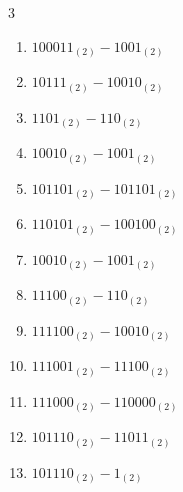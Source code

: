 \begin{multicols}{3}
\begin{enumerate}

  \item $100011_{(2)} - 1001_{(2)}$


  \item $10111_{(2)} - 10010_{(2)}$


  \item $1101_{(2)} - 110_{(2)}$


\columnbreak %

  \item $10010_{(2)} - 1001_{(2)}$


  \item $101101_{(2)} - 101101_{(2)}$


  \item $110101_{(2)} - 100100_{(2)}$


  \item $10010_{(2)} - 1001_{(2)}$


  \item $11100_{(2)} - 110_{(2)}$


  \item $111100_{(2)} - 10010_{(2)}$


  \item $111001_{(2)} - 11100_{(2)}$


  \item $111000_{(2)} - 110000_{(2)}$


  \item $101110_{(2)} - 11011_{(2)}$


  \item $101110_{(2)} - 1_{(2)}$



\end{enumerate}
\end{multicols}
